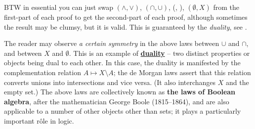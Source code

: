 \begin{note}
BTW in essential you can just swap \((\land, \lor)\), \((\cap, \cup)\), (, ), \((\emptyset, X)\) from the first-part of each proof to get the second-part of each proof, although sometimes the result may be clumsy, but it is valid. This is guaranteed by the \emph{duality}, see .
\end{note}

\begin{remark} \label{remark 3.1.30}
The reader may observe \emph{a certain symmetry} in the above laws between \(\cup\) and \(\cap\), and between \(X\) and \(\emptyset\). This is an example of \href{https://www.wikiwand.com/en/Duality_(mathematics)}{\textbf{duality}} -- two distinct properties or objects being dual to each other. In this case, the duality is manifested by the complementation relation \(A \mapsto X \setminus A \); the de Morgan laws assert that this relation converts unions into intersections and vice versa. (It also interchanges \(X\) and the empty set.) The above laws are collectively known as \textbf{the laws of Boolean algebra}, after the mathematician George Boole (1815–1864), and are also applicable to a number of other objects other than sets; it plays a
particularly important r\^{o}le in logic.
\end{remark}